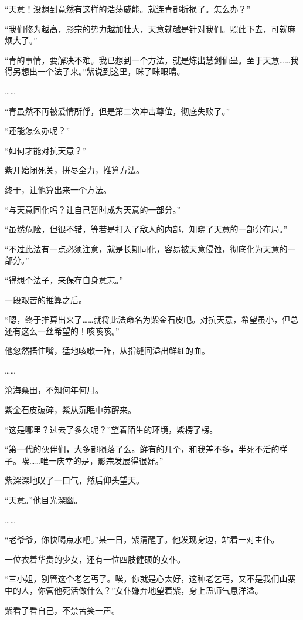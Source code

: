 \begin{this_body}
“天意！没想到竟然有这样的浩荡威能。就连青都折损了。怎么办？”

“我们修为越高，影宗的势力越加壮大，天意就越是针对我们。照此下去，可就麻烦大了。”

“青的事情，要解决不难。我已想到一个方法，就是炼出慧剑仙蛊。至于天意……我得另想出一个法子来。”紫说到这里，眯了眯眼睛。

……

“青虽然不再被爱情所俘，但是第二次冲击尊位，彻底失败了。”

“还能怎么办呢？”

“如何才能对抗天意？”

紫开始闭死关，拼尽全力，推算方法。

终于，让他算出来一个方法。

“与天意同化吗？让自己暂时成为天意的一部分。”

“虽然危险，但很不错，等若是打入了敌人的内部，知晓了天意的一部分布局。”

“不过此法有一点必须注意，就是长期同化，容易被天意侵蚀，彻底化为天意的一部分。”

“得想个法子，来保存自身意志。”

一段艰苦的推算之后。

“嗯，终于推算出来了……就将此法命名为紫金石皮吧。对抗天意，希望虽小，但总还有这么一丝希望的！咳咳咳。”

他忽然捂住嘴，猛地咳嗽一阵，从指缝间溢出鲜红的血。

……

沧海桑田，不知何年何月。

紫金石皮破碎，紫从沉眠中苏醒来。

“这是哪里？过去了多久呢？”望着陌生的环境，紫楞了楞。

“第一代的伙伴们，大多都陨落了么。鲜有的几个，和我差不多，半死不活的样子。唉……唯一庆幸的是，影宗发展得很好。”

紫深深地叹了一口气，然后仰头望天。

“天意。”他目光深幽。

……

“老爷爷，你快喝点水吧。”某一日，紫清醒了。他发现身边，站着一对主仆。

一位衣着华贵的少女，还有一位四肢健硕的女仆。

“三小姐，别管这个老乞丐了。唉，你就是心太好，这种老乞丐，又不是我们山寨中的人，你管他死活做什么？”女仆嫌弃地望着紫，身上蛊师气息洋溢。

紫看了看自己，不禁苦笑一声。

\end{this_body}

